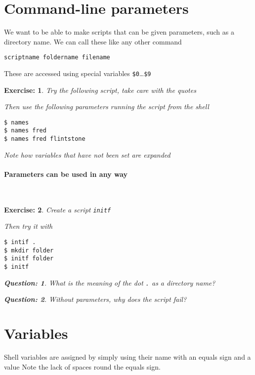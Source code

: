 \documentclass[a4paper]{article}
\newtheorem{exercise}{Exercise:}
\newtheorem{question}{Question:}
\begin{document}
\section{Command-line parameters }
We want to be able to make scripts that can be given parameters, such
as a directory name.  We can call these like any other command
\begin{verbatim}
scriptname foldername filename
\end{verbatim}
These are accessed using special variables
\texttt{\$0}\ldots\texttt{\$9}
\begin{exercise}
  Try the following script, take care with the quotes
  \begin{code}
  \end{code}
Then use the following parameters running the script from the shell
\begin{terminal}
\begin{verbatim}
$ names
$ names fred
$ names fred flintstone
\end{verbatim}
\end{terminal}
Note how variables that have not been set are expanded
\end{exercise}

\paragraph{Parameters can be used in any way}~\\
\begin{exercise}Create a script \texttt{initf}
\begin{code}[title=\texttt{inif}]
\end{code}
Then try it with
\begin{terminal}
\begin{verbatim}
$ intif .
$ mkdir folder
$ initf folder
$ initf
\end{verbatim}
\end{terminal}
\begin{question}
  What is the meaning of the dot \texttt{.} as a directory name?
\end{question}
\begin{question}
  Without parameters, why does the script fail?
\end{question}
\end{exercise}

\section{Variables}
Shell variables are assigned by simply using their name with an equals
sign and a value
Note the lack of spaces round the equals sign.
\end{document}
